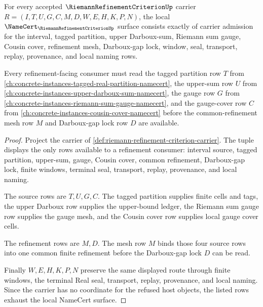 \begin{theorem}
\label{thm:riemann-refinement-criterion-namecert-obligations}
For every accepted $\RiemannRefinementCriterionUp$ carrier $R=(I,T,U,G,C,M,D,W,E,H,K,P,N)$, the local $\NameCert_{\RiemannRefinementCriterionUp}$ surface consists exactly of carrier admission for the interval, tagged partition, upper Darboux-sum, Riemann sum gauge, Cousin cover, refinement mesh, Darboux-gap lock, window, seal, transport, replay, provenance, and local naming rows.

Every refinement-facing consumer must read the tagged partition row $T$ from \autoref{ch:concrete-instances-tagged-real-partition-namecert}, the upper-sum row $U$ from \autoref{ch:concrete-instances-upper-darboux-sum-namecert}, the gauge row $G$ from \autoref{ch:concrete-instances-riemann-sum-gauge-namecert}, and the gauge-cover row $C$ from \autoref{ch:concrete-instances-cousin-cover-namecert} before the common-refinement mesh row $M$ and Darboux-gap lock row $D$ are available.
\end{theorem}
\begin{proof}
Project the carrier of \autoref{def:riemann-refinement-criterion-carrier}. The tuple displays the only rows available to a refinement consumer: interval source, tagged partition, upper-sum, gauge, Cousin cover, common refinement, Darboux-gap lock, finite windows, terminal seal, transport, replay, provenance, and local naming.

The source rows are $T,U,G,C$. The tagged partition supplies finite cells and tags, the upper Darboux row supplies the upper-bound ledger, the Riemann sum gauge row supplies the gauge mesh, and the Cousin cover row supplies local gauge cover cells.

The refinement rows are $M,D$. The mesh row $M$ binds those four source rows into one common finite refinement before the Darboux-gap lock $D$ can be read.

Finally $W,E,H,K,P,N$ preserve the same displayed route through finite windows, the terminal Real seal, transport, replay, provenance, and local naming. Since the carrier has no coordinate for the refused host objects, the listed rows exhaust the local NameCert surface.
\end{proof}

